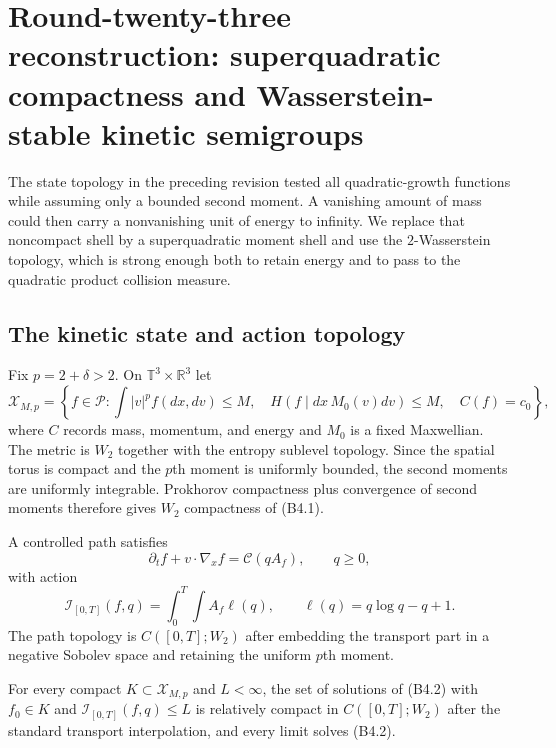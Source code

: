 \section{Round-twenty-three reconstruction: superquadratic compactness and Wasserstein-stable kinetic semigroups}
\label{sec:r23-b4}

The state topology in the preceding revision tested all quadratic-growth
functions while assuming only a bounded second moment.  A vanishing amount of
mass could then carry a nonvanishing unit of energy to infinity.  We replace
that noncompact shell by a superquadratic moment shell and use the
$2$-Wasserstein topology, which is strong enough both to retain energy and to
pass to the quadratic product collision measure.

\subsection{The kinetic state and action topology}

Fix $p=2+\delta>2$.  On $\mathbb T^3\times\mathbb R^3$ let
\[
 \mathcal X_{M,p}=\left\{f\in\mathcal P:
 \int |v|^p f(dx,dv)\le M,
 \quad H(f\mid dx\,M_0(v)dv)\le M,
 \quad C(f)=c_0\right\},                                 \tag{B4.1}
\]
where $C$ records mass, momentum, and energy and $M_0$ is a fixed Maxwellian.
The metric is $W_2$ together with the entropy sublevel topology.  Since the
spatial torus is compact and the $p$th moment is uniformly bounded, the second
moments are uniformly integrable.  Prokhorov compactness plus convergence of
second moments therefore gives $W_2$ compactness of (B4.1).

A controlled path satisfies
\[
 \partial_tf+v\cdot\nabla_xf=\mathcal C(qA_f),
 \qquad q\ge0,                                           \tag{B4.2}
\]
with action
\[
 \mathcal I_{[0,T]}(f,q)
 =\int_0^T\int A_f\ell(q),
 \qquad \ell(q)=q\log q-q+1.                             \tag{B4.3}
\]
The path topology is $C([0,T];W_2)$ after embedding the transport part in a
negative Sobolev space and retaining the uniform $p$th moment.

\begin{lemma}
\label{lem:r23-b4-compact}
For every compact $K\subset\mathcal X_{M,p}$ and $L<\infty$, the set of
solutions of (B4.2) with $f_0\in K$ and
$\mathcal I_{[0,T]}(f,q)\le L$ is relatively compact in
$C([0,T];W_2)$ after the standard transport interpolation, and every limit
solves (B4.2).
\end{lemma}

